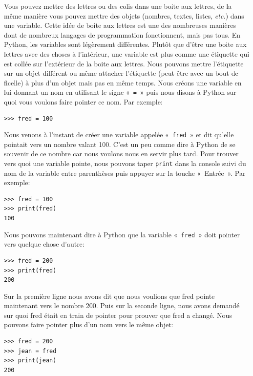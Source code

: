 Vous pouvez mettre des lettres ou des colis dans une boite aux lettres, de la même manière vous pouvez mettre des objets (nombres, textes, listes, \emph{etc.}) dans une variable. Cette idée de boite aux lettres est une des nombreuses manières dont de nombreux langages de programmation fonctionnent, mais pas tous.
En Python, les variables sont légèrement différentes. Plutôt que d'être une boite aux lettres avec des choses à l'intérieur, une variable est plus comme une étiquette qui est collée sur l'extérieur de la boite aux lettres. Nous pouvons mettre l'étiquette sur un objet différent ou même attacher l'étiquette (peut-être avec un bout de ficelle) à plus d'un objet mais pas en même temps. Nous créons une variable en lui donnant un nom en utilisant le signe «~\texttt{=}~» puis nous disons à Python sur quoi vous voulons faire pointer ce nom. Par exemple:\\

\begin{Verbatim}[frame=single,rulecolor=\color{mbleu}, label=à taper]
>>> fred = 100
\end{Verbatim}

Nous venons à l'instant de créer une variable appelée «~\texttt{fred}~» et dit qu'elle pointait vers un nombre valant 100. C'est un peu comme dire à Python de se souvenir de ce nombre car nous voulons nous en servir plus tard. Pour trouver vers quoi une variable pointe, nous pouvons taper \texttt{print} dans la console suivi du nom de la variable entre parenthèses puis appuyer sur la touche «~Entrée~». Par exemple:

\begin{Verbatim}[frame=single,rulecolor=\color{mbleu}, label=à taper]
>>> fred = 100
>>> print(fred)
100
\end{Verbatim}

Nous pouvons maintenant dire à Python que la variable «~\texttt{fred}~» doit pointer vers quelque chose d'autre:

\begin{Verbatim}[frame=single,rulecolor=\color{mbleu}, label=à taper]
>>> fred = 200
>>> print(fred)
200
\end{Verbatim}

Sur la première ligne nous avons dit que nous voulions que fred pointe maintenant vers le nombre 200. Puis sur la seconde ligne, nous avons demandé sur quoi fred était en train de pointer pour prouver que fred a changé. Nous pouvons faire pointer plus d'un nom vers le même objet:

\begin{Verbatim}[frame=single,rulecolor=\color{mbleu}, label=à taper]
>>> fred = 200
>>> jean = fred
>>> print(jean)
200
\end{Verbatim}

